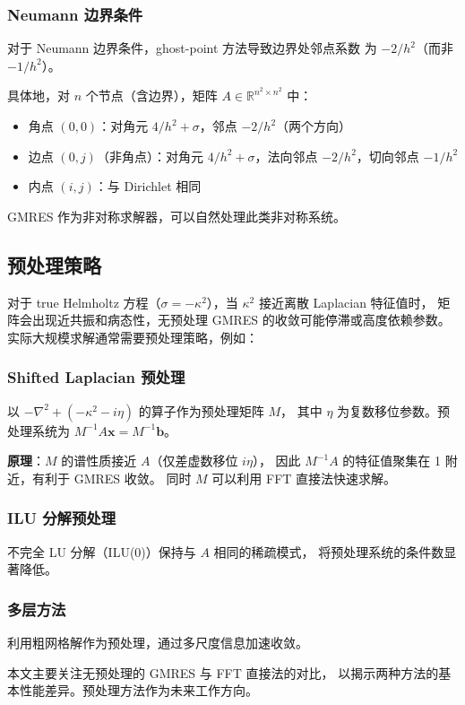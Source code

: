 \subsubsection{Neumann 边界条件}

对于 Neumann 边界条件，ghost-point 方法导致边界处邻点系数
为 $-2/h^2$（而非 $-1/h^2$）。

具体地，对 $n$ 个节点（含边界），矩阵 $A \in \mathbb{R}^{n^2 \times n^2}$ 中：
\begin{itemize}[itemsep=2pt]
  \item 角点 $(0,0)$：对角元 $4/h^2 + \sigma$，邻点 $-2/h^2$（两个方向）
  \item 边点 $(0,j)$（非角点）：对角元 $4/h^2 + \sigma$，法向邻点 $-2/h^2$，切向邻点 $-1/h^2$
  \item 内点 $(i,j)$：与 Dirichlet 相同
\end{itemize}

GMRES 作为非对称求解器，可以自然处理此类非对称系统。

\subsection{预处理策略}

对于 true Helmholtz 方程（$\sigma=-\kappa^2$），当 $\kappa^2$ 接近离散 Laplacian 特征值时，
矩阵会出现近共振和病态性，无预处理 GMRES 的收敛可能停滞或高度依赖参数。
实际大规模求解通常需要预处理策略，例如：

\subsubsection{Shifted Laplacian 预处理}

以 $-\nabla^2 + (-\kappa^2 - i\eta)$ 的算子作为预处理矩阵 $M$，
其中 $\eta$ 为复数移位参数。预处理系统为 $M^{-1}A\mathbf{x} = M^{-1}\mathbf{b}$。

\textbf{原理}：$M$ 的谱性质接近 $A$（仅差虚数移位 $i\eta$），
因此 $M^{-1}A$ 的特征值聚集在 1 附近，有利于 GMRES 收敛。
同时 $M$ 可以利用 FFT 直接法快速求解。

\subsubsection{ILU 分解预处理}

不完全 LU 分解（ILU(0)）保持与 $A$ 相同的稀疏模式，
将预处理系统的条件数显著降低。

\subsubsection{多层方法}

利用粗网格解作为预处理，通过多尺度信息加速收敛。

本文主要关注无预处理的 GMRES 与 FFT 直接法的对比，
以揭示两种方法的基本性能差异。预处理方法作为未来工作方向。
